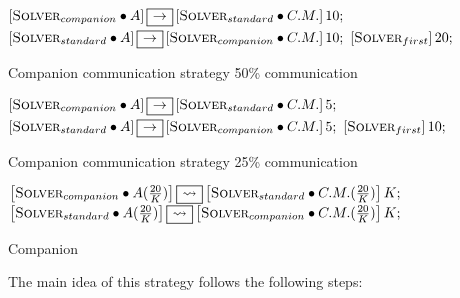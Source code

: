 \begin{algorithm}[!h]
\dontprintsemicolon
\SetNoline
$\left[\eqsolverposl{companion}\posldot A\right] \onetoone \left[\eqsolverposl{standard}\posldot C.M.\right]10;$\;
$\left[\eqsolverposl{standard}\posldot A\right] \onetoone \left[\eqsolverposl{companion}\posldot C.M.\right]10;$\;
$\left[\textbf{{\sc Solver}}_{first}\right]20;$\;
\caption{Companion communication strategy 50\% communication}\label{comm:golfers_v2_50}
\end{algorithm}

\begin{algorithm}[!h]
\dontprintsemicolon
\SetNoline
$\left[\eqsolverposl{companion}\posldot A\right] \onetoone \left[\eqsolverposl{standard}\posldot C.M.\right]5;$\;
$\left[\eqsolverposl{standard}\posldot A\right] \onetoone \left[\eqsolverposl{companion}\posldot C.M.\right]5;$\;
$\left[\textbf{{\sc Solver}}_{first}\right]10;$\;
\caption{Companion communication strategy 25\% communication}\label{comm:golfers_v2_25}
\end{algorithm} 

\begin{algorithm}[!h]
\dontprintsemicolon
\SetNoline
$\left[\eqsolverposl{companion}\posldot A(\tfrac{20}{K})\right] \oneton \left[\eqsolverposl{standard}\posldot C.M.(\tfrac{20}{K})\right]K;$\;
$\left[\eqsolverposl{standard}\posldot A(\tfrac{20}{K})\right] \oneton \left[\eqsolverposl{companion}\posldot C.M.(\tfrac{20}{K})\right]K;$
\caption{Companion \commstr{} \oneTn{}}\label{comm:golfers_v2_1-n}
\end{algorithm}

The main idea of this strategy follows the following steps:


